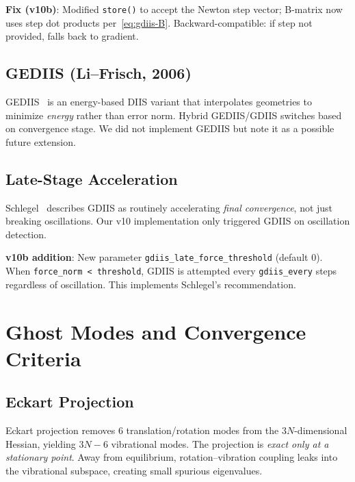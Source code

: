 \documentclass[11pt,a4paper]{article}
\theoremstyle{definition}
\begin{document}
\textbf{Fix (v10b)}: Modified \texttt{store()} to accept the Newton step
vector; B-matrix now uses step dot products per~\eqref{eq:gdiis-B}.
Backward-compatible: if step not provided, falls back to gradient.

\subsection{GEDIIS (Li--Frisch, 2006)}
\label{sec:gediis}

GEDIIS~\citep{li-frisch-gediis} is an energy-based DIIS variant that
interpolates geometries to minimize \emph{energy} rather than error norm.
Hybrid GEDIIS/GDIIS switches based on convergence stage.
We did not implement GEDIIS but note it as a possible future extension.

\subsection{Late-Stage Acceleration}
\label{sec:gdiis-late}

Schlegel~\citep{schlegel2011} describes GDIIS as routinely accelerating
\emph{final convergence}, not just breaking oscillations.
Our v10 implementation only triggered GDIIS on oscillation detection.

\textbf{v10b addition}: New parameter \texttt{gdiis\_late\_force\_threshold}
(default 0).  When \texttt{force\_norm < threshold}, GDIIS is attempted every
\texttt{gdiis\_every} steps regardless of oscillation.  This implements
Schlegel's recommendation.

\section{Ghost Modes and Convergence Criteria}
\label{sec:ghost-modes}

\subsection{Eckart Projection}

Eckart projection removes 6 translation/rotation modes from the $3N$-dimensional
Hessian, yielding $3N{-}6$ vibrational modes.  The projection is
\emph{exact only at a stationary point}.  Away from equilibrium,
rotation--vibration coupling leaks into the vibrational subspace,
creating small spurious eigenvalues.
\end{document}
